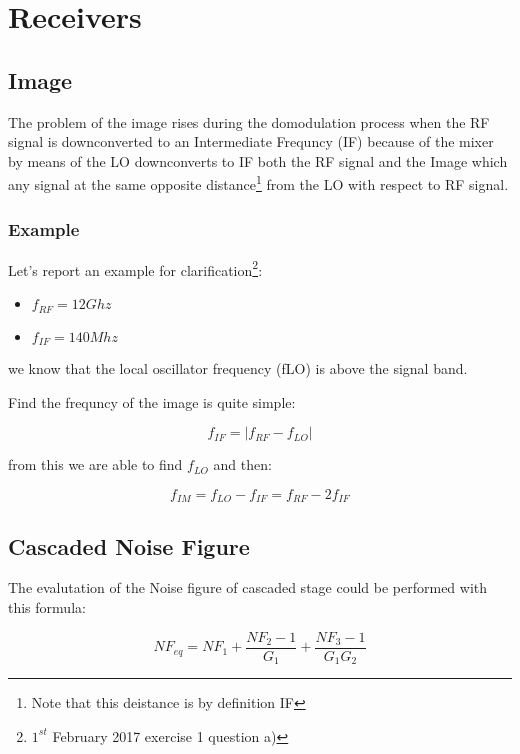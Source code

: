 


\chapter{Receivers} %
\label{cha:receivers}


\section{Image} %
\label{sec:image}

The problem of the image rises during the domodulation process when the RF signal is downconverted to an Intermediate Frequncy (IF) because of the mixer by means of the LO downconverts to IF both the RF signal and the Image which any signal at the same opposite distance\footnote{Note that this deistance is by definition IF} from the LO with respect to RF signal.

\subsection*{Example} %
\label{sub:example}

Let's report an example for clarification\footnote{$1^{st}$ February 2017 exercise 1 question a)}:
\begin{itemize}
	\item $f_{RF}= 12 Ghz$ 
	\item $f_{IF}= 140 Mhz$ 
\end{itemize}

we know that the local oscillator frequency (fLO) is above the signal band.

Find the frequncy of the image is quite simple:


\begin{equation}
	f_{IF}=|f_{RF}-f_{LO}|
\end{equation}

from this we are able to find $f_{LO}$ and then:

\begin{equation}
		f_{IM}=f_{LO}-f_{IF}= f_{RF}-2f_{IF}
\end{equation}


\section{Cascaded Noise Figure} %
\label{sec:cascaded_noise_figure}

The evalutation of the Noise figure of cascaded stage could be performed with this formula:

\begin{equation}
	NF_{eq}= NF_1 + \frac{NF_2-1}{G_1} + \frac{NF_3-1}{G_1G_2} 
\end{equation}




